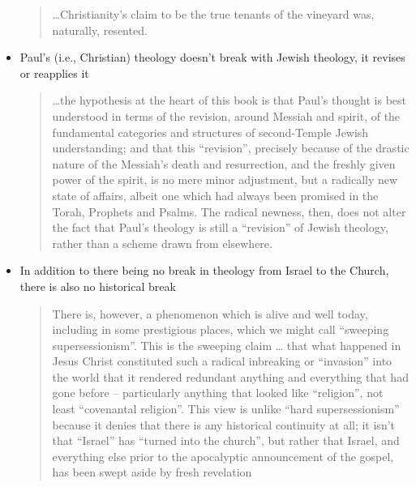 \begin{itemize}
\begin{quote}
            \dots Christianity's claim to be the true tenants of the vineyard
            was, naturally, resented.
            \autocite[467]{wright:1992}
        \end{quote}

    \item Paul's (i.e., Christian) theology doesn't break with Jewish theology,
        it revises or reapplies it

        \begin{quote}
            \dots the hypothesis at the heart of this book is that Paul's
            thought is best understood in terms of the revision, around Messiah
            and spirit, of the fundamental categories and structures of
            second-Temple Jewish understanding; and that this
            \enquote{revision}, precisely because of the drastic nature of the
            Messiah's death and resurrection, and the freshly given power of the
            spirit, is no mere minor adjustment, but a radically new state of
            affairs, albeit one which had always been promised in the Torah,
            Prophets and Psalms. The radical newness, then, does not alter the
            fact that Paul's theology is still a \enquote{revision} of Jewish
            theology, rather than a scheme drawn from elsewhere.
            \autocite[783]{wright:2013}
        \end{quote}

    \item In addition to there being no break in theology from Israel to the
        Church, there is also no historical break

        \begin{quote}
            There is, however, a phenomenon which is alive and well today,
            including in some prestigious places, which we might call
            \enquote{sweeping supersessionism}. This is the sweeping claim \dots
            that what happened in Jesus Christ constituted such a radical
            inbreaking or \enquote{invasion} into the world that it rendered
            redundant anything and everything that had gone before --
            particularly anything that looked like \enquote{religion}, not least
            \enquote{covenantal religion}. This view is unlike \enquote{hard
            supersessionism} because it denies that there is any historical
            continuity at all; it isn't that \enquote{Israel} has
            \enquote{turned into the church}, but rather that Israel, and
            everything else prior to the apocalyptic announcement of the gospel,
            has been swept aside by fresh revelation
            \autocite[807]{wright:2013}
        \end{quote}
\end{itemize}

